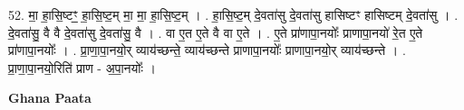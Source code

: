 \documentclass[17pt]{extarticle}
\begin{document}
52. मा॒ हा॒सि॒ष्टꣳ॒॒ हा॒सि॒ष्ट॒म् मा॒ मा॒ हा॒सि॒ष्ट॒म् । . हा॒सि॒ष्ट॒म् दे॒वता॑सु दे॒वता॑सु हासिष्टꣳ हासिष्टम् दे॒वता॑सु । . दे॒वता॑सु॒ वै वै दे॒वता॑सु दे॒वता॑सु॒ वै । . वा ए॒त ए॒ते वै वा ए॒ते । . ए॒ते प्रा॑णापा॒नयोः᳚ प्राणापा॒नयो॑ रे॒त ए॒ते प्रा॑णापा॒नयोः᳚ । . प्रा॒णा॒पा॒नयो॒र् व्याय॑च्छन्ते॒ व्याय॑च्छन्ते प्राणापा॒नयोः᳚ प्राणापा॒नयो॒र् व्याय॑च्छन्ते । . प्रा॒णा॒पा॒नयो॒रिति॑ प्राण - अ॒पा॒नयोः᳚ । \newline

\textbf{Ghana Paata } \newline
\end{document}
